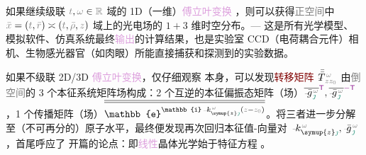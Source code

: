 如果继续级联 $\mathcolor{gray}{t}, \mathcolor{gray}{\omega} \in \mathcolor{gray}{\mathbb{R}}$ 域的 1D（一维）\textcolor{Plum}{傅立叶变换} ，则可以获得\textcolor{gray}{正空间}中 $\mathcolor{gray}{\bar{x}} = \left( \mathcolor{gray}{t}, \mathcolor{gray}{\bar{r}} \right) \asymp \left( \mathcolor{gray}{t}, \mathcolor{gray}{\bar{\rho}}, \mathcolor{gray}{z} \right)$ 域上的光电场的 $1+3$ 维时空分布。--- 这是所有光学模型、模拟软件、仿真系统最终\textcolor{Plum}{输出}的计算结果，也是实验室 CCD（电荷耦合元件）相机、生物感光器官（如肉眼）所能直接捕获和探测到的实验数据。

如果不级联 2D/3D \textcolor{Plum}{傅立叶变换}，仅仔细观察  本身，可以发现\textcolor{Maroon}{转移矩阵} $\Xint{\mathcolor{gray}{-}}{30}{\bar{\bar{T}}}^{\;\!\mathcolor{gray}{\omega}}_{\;\! \mathcolor{gray}{z} \mathcolor{gray}{z_0}}$ 由\textcolor{gray}{倒空间}的 3 个\textcolor{PineGreen}{本征系统}矩阵场构成：2 个互逆的\textcolor{PineGreen}{本征偏振态矩阵}（场）$\overline{\Xint{{}^{}_{\mathcolor{gray}{-}}}{10}{\bar{g}}^{\;\!\mathcolor{gray}{\omega}}_{\;\! \textcolor{PineGreen}{\jmath}}}^{\mathsf{\textcolor{Plum}{T}}}, \overline{\Xint{{}^{}_{\mathcolor{gray}{-}}}{10}{\bar{g}}^{\;\!\mathcolor{gray}{\omega}}_{\;\! \textcolor{PineGreen}{\jmath}}}^{\textcolor{Plum}{-\mathsf{T}}}$，1 个\textcolor{PineGreen}{传播矩阵}（场）$\overline{\overline{\mathbb{e}^{\mathbb{i} \Xint{\begin{smallmatrix} ~ \\ {}^{}_{\mathcolor{gray}{-}} \\ ~ \end{smallmatrix}}{15}{k}_{\symup{z} \textcolor{PineGreen}{\jmath}}^{\;\! \mathcolor{gray}{\omega}} \left( \mathcolor{gray}{z} - \mathcolor{gray}{z_0} \right)}}}$。将三者进一步分解至（不可再分的）原子水平，最终便发现再次回归\textcolor{PineGreen}{本征值}-\textcolor{PineGreen}{向量}对 $\Xint{\begin{smallmatrix} ~ \\ {}^{}_{\mathcolor{gray}{-}} \\ ~ \end{smallmatrix}}{15}{k}_{\symup{z} \textcolor{PineGreen}{\jmath}}^{\;\! \mathcolor{gray}{\omega}}, \Xint{{}^{}_{\mathcolor{gray}{-}}}{10}{\bar{g}}^{\;\!\mathcolor{gray}{\omega}}_{\;\! \textcolor{PineGreen}{\jmath}}$，首尾呼应了  开篇的论点：即\textcolor{Plum}{线性}\textcolor{PineGreen}{晶体光学}始于\textcolor{PineGreen}{特征方程} 。

